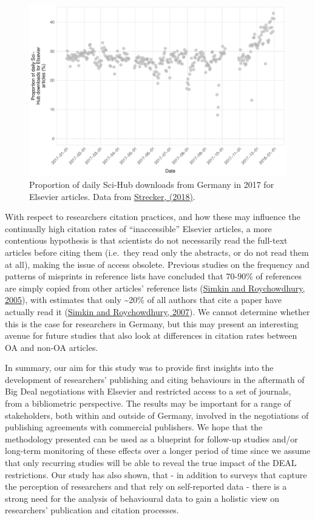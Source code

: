 \documentclass[
]{article}
\begin{document}
\begin{figure}

{\centering \includegraphics[width=0.75\linewidth]{analysis_files/figure-latex/scihub-germany-1} 

}

\caption{Proportion of daily Sci-Hub downloads from Germany in 2017 for Elsevier articles. Data from \href{http://doi.org/10.5281/zenodo.1286284}{Strecker, (2018)}.}\label{fig:scihub-germany}
\end{figure}

With respect to researchers citation practices, and how these may influence the continually high citation rates of ``inaccessible'' Elsevier articles, a more contentious hypothesis is that scientists do not necessarily read the full-text articles before citing them (i.e.~they read only the abstracts, or do not read them at all), making the issue of access obsolete. Previous studies on the frequency and patterns of misprints in reference lists have concluded that 70-90\% of references are simply copied from other articles' reference lists (\href{https://doi.org/10.1007/s11192-005-0028-2}{Simkin and Roychowdhury, 2005}), with estimates that only \textasciitilde20\% of all authors that cite a paper have actually read it (\href{https://doi.org/10.1002/asi.20653}{Simkin and Roychowdhury, 2007}). We cannot determine whether this is the case for researchers in Germany, but this may present an interesting avenue for future studies that also look at differences in citation rates between OA and non-OA articles.

In summary, our aim for this study was to provide first insights into the development of researchers' publishing and citing behaviours in the aftermath of Big Deal negotiations with Elsevier and restricted access to a set of journals, from a bibliometric perspective. The results may be important for a range of stakeholders, both within and outside of Germany, involved in the negotiations of publishing agreements with commercial publishers. We hope that the methodology presented can be used as a blueprint for follow-up studies and/or long-term monitoring of these effects over a longer period of time since we assume that only recurring studies will be able to reveal the true impact of the DEAL restrictions. Our study has also shown, that - in addition to surveys that capture the perception of researchers and that rely on self-reported data - there is a strong need for the analysis of behavioural data to gain a holistic view on researchers' publication and citation processes.
\end{document}
